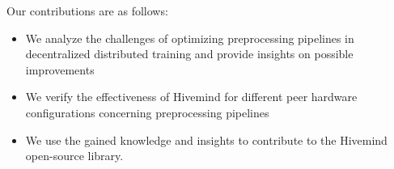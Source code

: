 Our contributions are as follows:
\begin{itemize}
    \item We analyze the challenges of optimizing preprocessing pipelines in decentralized distributed training and provide insights on possible improvements
    \item We verify the effectiveness of Hivemind for different peer hardware configurations concerning preprocessing pipelines
    \item We use the gained knowledge and insights to contribute to the Hivemind open-source library.
\end{itemize}
